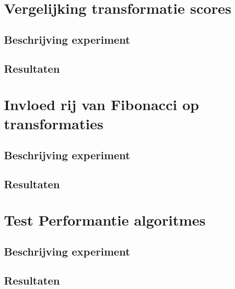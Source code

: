 \section{Vergelijking transformatie scores}
\label{experiment:5}
\subsection{Beschrijving experiment}

\subsection{Resultaten}

\section{Invloed rij van Fibonacci op transformaties}
\label{experiment:6}
\subsection{Beschrijving experiment}

\subsection{Resultaten}

\section{Test Performantie algoritmes}
\label{experiment:7}
\subsection{Beschrijving experiment}

\subsection{Resultaten}

